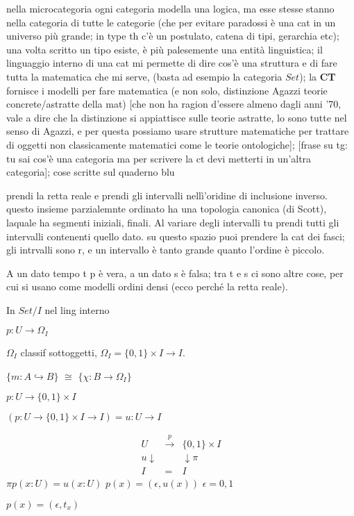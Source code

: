 \documentclass[a4paper, 11pt]{article}
\begin{document}
nella microcategoria ogni categoria modella una logica, ma esse stesse stanno nella categoria di tutte le categorie (che per evitare paradossi è una cat in un universo più grande; in type th c'è un postulato, catena di tipi, gerarchia etc); una volta scritto un tipo esiste, è più palesemente una entità linguistica; 
il linguaggio interno di una cat mi permette di dire cos'è una struttura e di fare tutta la matematica che mi serve, (basta ad esempio la categoria $Set$); la \textbf{CT} fornisce i modelli per fare matematica (e non solo, distinzione Agazzi teorie concrete/astratte della mat) [che non ha ragion d'essere almeno dagli anni '70, vale a dire che la distinzione si appiattisce sulle teorie astratte, lo sono tutte nel senso di Agazzi, e per questa possiamo usare strutture matematiche per trattare di oggetti non classicamente matematici come le teorie ontologiche];  [frase su tg: tu sai cos'è una categoria ma per scrivere la ct devi metterti in un'altra categoria]; cose scritte sul quaderno blu 


prendi la retta reale e prendi gli intervalli nellì'oridine di inclusione inverso. questo insieme parzialemnte ordinato ha una topologia canonica (di Scott), laquale ha segmenti iniziali, finali. Al variare degli intervalli tu prendi tutti gli intervalli contenenti quello dato. su questo spazio puoi prendere la cat dei fasci; gli intrvalli sono r, e un intervallo è tanto grande quanto l'ordine è piccolo. 

A un dato tempo t p è vera, a un dato s è falsa; tra t e s ci sono altre cose, per cui si usano come modelli ordini densi (ecco perché la retta reale). 

In $Set/I$ nel ling interno

$p : U \to \Omega_I$

$\Omega_I$ classif sottoggetti, $\Omega_I = \{0,1\}\times I \to I$.

$\{ m : A \hookrightarrow B\}$ $\cong$ $\{ \chi : B \to \Omega_I\}$

$p : U \to \{0,1\}\times I$

$(p : U \to \{0,1\}\times I \to I) = u : U \to I$

$$
\begin{array}{ccc}
U &\overset{p}\to& \{0,1\}\times I \\
u\downarrow && \downarrow\pi \\
I &=& I
\end{array}
$$
$\pi p(x : U) = u(x : U)$
$p(x) = (\epsilon, u(x))$ $\epsilon =0,1$

$p(x) = (\epsilon, t_x)$
\end{document}
